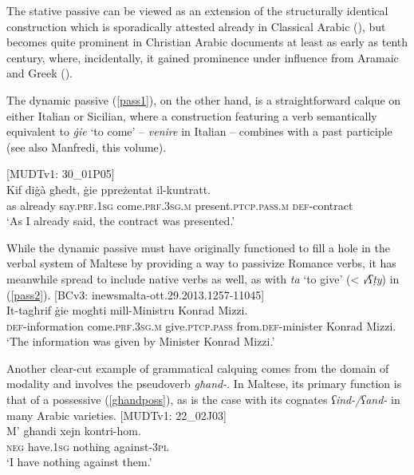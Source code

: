 \documentclass[output=paper]{langsci/langscibook}
\begin{document}
The stative passive can be viewed as an extension of the structurally identical construction which is sporadically attested already in Classical Arabic (\citealt[76--84]{Ullmann1989}), but becomes quite prominent in Christian Arabic documents at least as early as tenth century, where, incidentally, it gained prominence under influence from Aramaic and Greek (\citealt[424]{Blau1967}).

The dynamic passive (\ref{pass1}), on the other hand, is a straightforward calque on either Italian or Sicilian, where a construction featuring a verb semantically equi\-valent to \textit{ġie} `to come' -- \textit{venire} in Italian -- combines with a past participle (see also Manfredi, this volume).

\ea\label{pass1} 
{[MUDTv1: 30\_01P05]} \\
\gll Kif diġà għedt, ġie ppreżentat il-kuntratt.\\
	as already say.\textsc{prf.1sg} come.\textsc{prf.3sg.m} present.\textsc{ptcp.pass.m} \textsc{def}-contract\\
	\glt `As I already said, the contract was presented.'\\
\z

While the dynamic passive must have originally functioned to fill a hole in the verbal system of Maltese by providing a way to passivize Romance verbs, it has meanwhile spread to include native verbs as well, as with \textit{ta} `to give' (< \textit{√ʕṭy}) in (\ref{pass2}).
\ea\label{pass2} 
{[BCv3: inewsmalta-ott.29.2013.1257-11045]} \\
\gll It-tagħrif ġie mogħti mill-Ministru Konrad Mizzi.\\
	\textsc{def}-information come.\textsc{prf.3sg.m} give.\textsc{ptcp.pass} from.\textsc{def}-minister Konrad Mizzi.\\
	\glt `The information was given by Minister Konrad Mizzi.'\\
\z

Another clear-cut example of grammatical calquing comes from the domain of modality and involves the pseudoverb \textit{għand-}. In Maltese, its primary function is that of a possessive (\ref{ghandposs}), as is the case with its cognates \textit{ʕind-/ʕand-} in many Arabic varieties.
\ea\label{ghandposs}  
{[MUDTv1: 22\_02J03]} \\
    \gll M' għandi xejn kontri-hom.\\
	\textsc{neg} have.\textsc{1sg} nothing against-\textsc{3pl}\\
	\glt `I have nothing against them.'\\
\z
\end{document}
